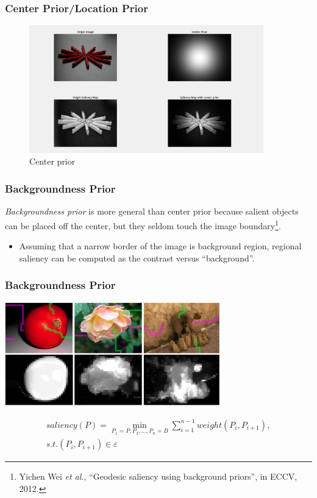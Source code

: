 \documentclass[notheorems,serif,table,compress]{beamer}  %
\begin{document}
\begin{frame}
\frametitle{Center Prior/Location Prior}
\begin{figure}
  \centering
\includegraphics[width=4in]{center_prior.png}
  \caption{Center prior}
 \label{center prior}
  \end{figure}
\end{frame}


\begin{frame}
\frametitle{ Backgroundness Prior}
{\color{blue}\emph{Backgroundness prior}} is more general than center prior because salient objects can be placed off the center, but they seldom touch the image boundary\footnote{Yichen Wei \textit{et al.}, ``Geodesic saliency using background priors'', in ECCV, 2012.}.
\begin{itemize}
\item Assuming that a narrow border of the image is background region, regional saliency can be computed as the contrast versus ``background''.
\end{itemize}
\vspace{0.3in}
\end{frame}

\begin{frame}
\frametitle{ Backgroundness Prior}
\centering\includegraphics[width=0.7\textwidth]{GS.png}

\begin{align}
saliency(P) = \min_{P_1=P, P_2, \ldots, P_n=B}\sum_{i=1}^{n-1}weight(P_i, P_{i+1}), \\
s.t.(P_i, P_{i+1})\in \varepsilon \nonumber
\end{align}
\end{frame}
\end{document}
